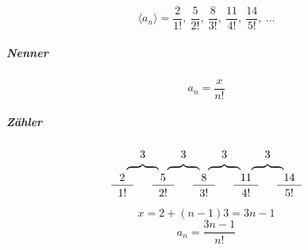 \begin{uebung}[3]
	\begin{aufgabe}
		\[
			\langle a_n \rangle = \frac{2}{1!},\ \frac{5}{2!},\ \frac{8}{3!},\ \frac{11}{4!},\ \frac{14}{5!},\ \ldots
		\]
	\end{aufgabe}

	\begin{loesung}
		\subparagraph{Nenner}
		\[
			a_n = \frac{x}{n!}
		\]
		\subparagraph{Zähler}
		\[
			\begin{tabular}{ccccccccccccc}
				   & 3    &    & 3    &    & 3    &    & 3                  \\[-3pt]
				   & \obf &    & \obf &    & \obf &    & \obf               \\
				2  &      & 5  &      & 8  &      & 11 &      & 14          \\
				\cline{1-1} \cline{3-3} \cline{5-5} \cline{7-7} \cline{9-9} \\[-10pt]
				1! &      & 2! &      & 3! &      & 4! &      & 5!          \\
			\end{tabular}
		\]
		\[
			x = 2 + (n-1) 3 = 3n - 1
		\]
		\[
			a_n = \frac{3n - 1}{n!}
		\]
	\end{loesung}
\end{uebung}


